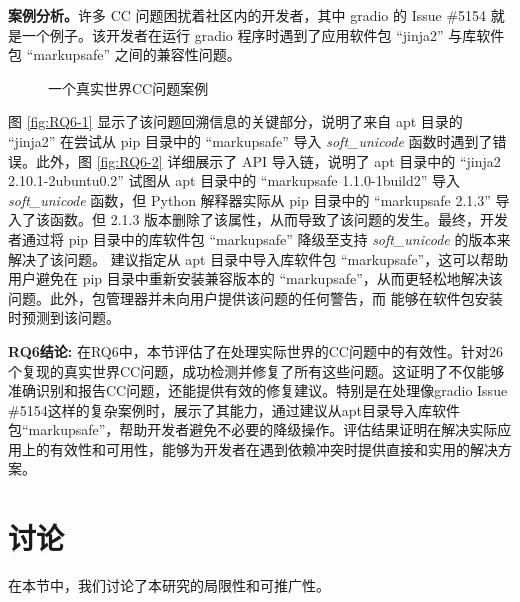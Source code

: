 \textbf{案例分析。}许多 CC 问题困扰着社区内的开发者，其中 gradio 的 Issue \#5154  就是一个例子。该开发者在运行 gradio 程序时遇到了应用软件包 “jinja2” 与库软件包 “markupsafe” 之间的兼容性问题。
\begin{figure}[t]
	\centering
	\hspace{4em}
	\caption{一个真实世界CC问题案例}
	\label{fig:RQ6}
\end{figure}
图 \ref{fig:RQ6-1}  显示了该问题回溯信息的关键部分，说明了来自 apt 目录的 “jinja2” 在尝试从 pip 目录中的 “markupsafe” 导入 \textit{soft\_unicode} 函数时遇到了错误。此外，图 \ref{fig:RQ6-2} 详细展示了 API 导入链，说明了 apt 目录中的 “jinja2 2.10.1-2ubuntu0.2” 试图从 apt 目录中的 “markupsafe 1.1.0-1build2” 导入 \textit{soft\_unicode} 函数，但 Python 解释器实际从 pip 目录中的 “markupsafe 2.1.3” 导入了该函数。但 2.1.3 版本删除了该属性，从而导致了该问题的发生。最终，开发者通过将 pip 目录中的库软件包 “markupsafe” 降级至支持 \textit{soft\_unicode} 的版本来解决了该问题。\tool{} 建议指定从 apt 目录中导入库软件包 “markupsafe”，这可以帮助用户避免在 pip 目录中重新安装兼容版本的 “markupsafe”，从而更轻松地解决该问题。此外，包管理器并未向用户提供该问题的任何警告，而 \tool{} 能够在软件包安装时预测到该问题。

\begin{tcolorbox}[boxrule=1pt,boxsep=1pt,left=2pt,right=2pt,top=2pt,bottom=2pt]
	\small
	\textcolor{red}{} \noindent\textbf{RQ6结论:} 
	在RQ6中，本节评估了\tool{}在处理实际世界的CC问题中的有效性。针对26个复现的真实世界CC问题，\tool{}成功检测并修复了所有这些问题。这证明了\tool{}不仅能够准确识别和报告CC问题，还能提供有效的修复建议。特别是在处理像gradio Issue \#5154这样的复杂案例时，\tool{}展示了其能力，通过建议从apt目录导入库软件包“markupsafe”，帮助开发者避免不必要的降级操作。评估结果证明\tool{}在解决实际应用上的有效性和可用性，能够为开发者在遇到依赖冲突时提供直接和实用的解决方案。
\end{tcolorbox} 

\section{讨论}
在本节中，我们讨论了本研究的局限性和可推广性。
